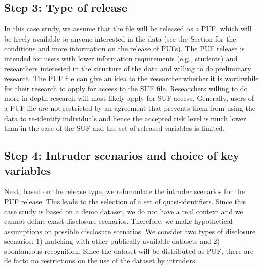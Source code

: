 \documentclass[letterpaper,10pt,english]{sphinxmanual}
\begin{document}
\subsection{Step 3: Type of release}
\label{\detokenize{case_studies:id6}}
In this case study, we assume that the file will be released as a PUF,
which will be freely available to anyone interested in the data (see
the Section 
for the conditions and more information on the release of
PUFs). The PUF release is intended for users with lower information
requirements (e.g., students) and researchers interested in the
structure of the data and willing to do preliminary research. The PUF
file can give an idea to the researcher whether it is worthwhile for
their research to apply for access to the SUF file. Researchers willing
to do more in-depth research will most likely apply for SUF access.
Generally, users of a PUF file are not restricted by an agreement that
prevents them from using the data to re-identify individuals and hence
the accepted risk level is much lower than in the case of the SUF and
the set of released variables is limited.


\subsection{Step 4: Intruder scenarios and choice of key variables}
\label{\detokenize{case_studies:id7}}
Next, based on the release type, we reformulate the intruder scenarios
for the PUF release. This leads to the selection of a set of
quasi-identifiers. Since this case study is based on a demo dataset, we
do not have a real context and we cannot define exact disclosure
scenarios. Therefore, we make hypothetical assumptions on possible
disclosure scenarios. We consider two types of disclosure scenarios: 1)
matching with other publically available datasets and 2) spontaneous
recognition. Since the dataset will be distributed as PUF, there are de
facto no restrictions on the use of the dataset by intruders.
\end{document}
